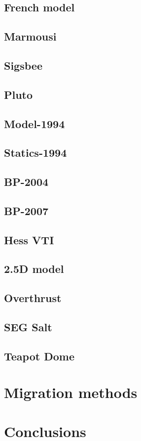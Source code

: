 \subsection{French model}

\subsection{Marmousi}

\subsection{Sigsbee}

\subsection{Pluto}

\subsection{Model-1994}

\subsection{Statics-1994}

\subsection{BP-2004}

\subsection{BP-2007}

\subsection{Hess VTI}

\subsection{2.5D model}

\subsection{Overthrust}

\subsection{SEG Salt}

\subsection{Teapot Dome}

\section{Migration methods}

\section{Conclusions}

